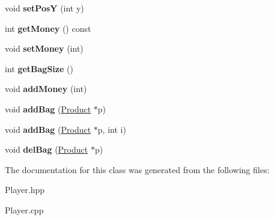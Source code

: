 \begin{DoxyCompactItemize}
void {\bfseries set\+PosY} (int y)
\item 
\mbox{\label{class_player_aed6ceb1d2d434747fbea5a7fc9f829e4}} 
int {\bfseries get\+Money} () const
\item 
\mbox{\label{class_player_ada9de45d0210f1b36a7a3b396cc64129}} 
void {\bfseries set\+Money} (int)
\item 
\mbox{\label{class_player_ade515f9b8f17dcb76aa3582d6d30c744}} 
int {\bfseries get\+Bag\+Size} ()
\item 
\mbox{\label{class_player_a5b139f6cbbaee1a613b0e5b733202b59}} 
void {\bfseries add\+Money} (int)
\item 
\mbox{\label{class_player_a697bf11e596fea878c2d8762719bf414}} 
void {\bfseries add\+Bag} (\mbox{\hyperlink{class_product}{Product}} $\ast$p)
\item 
\mbox{\label{class_player_a81597f7e1a1311beeecd7f1adc6e2b2e}} 
void {\bfseries add\+Bag} (\mbox{\hyperlink{class_product}{Product}} $\ast$p, int i)
\item 
\mbox{\label{class_player_abfaeb8e5c51b9ea49ede44de9d0d1b45}} 
void {\bfseries del\+Bag} (\mbox{\hyperlink{class_product}{Product}} $\ast$p)
\end{DoxyCompactItemize}


The documentation for this class was generated from the following files\+:\begin{DoxyCompactItemize}
\item 
Player.\+hpp\item 
Player.\+cpp\end{DoxyCompactItemize}
